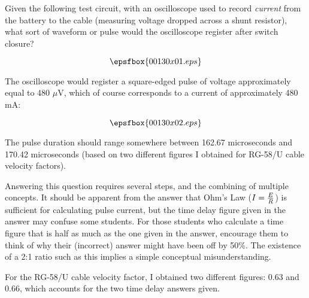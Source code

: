 

Given the following test circuit, with an oscilloscope used to record {\it current} from the battery to the cable (measuring voltage dropped across a shunt resistor), what sort of waveform or pulse would the oscilloscope register after switch closure?

$$\epsfbox{00130x01.eps}$$







The oscilloscope would register a square-edged pulse of voltage approximately equal to 480 $\mu$V, which of course corresponds to a current of approximately 480 mA:

$$\epsfbox{00130x02.eps}$$

The pulse duration should range somewhere between 162.67 microseconds and 170.42 microseconds (based on two different figures I obtained for RG-58/U cable velocity factors).







Answering this question requires several steps, and the combining of multiple concepts.  It should be apparent from the answer that Ohm's Law ($I = {E \over R}$) is sufficient for calculating pulse current, but the time delay figure given in the answer may confuse some students.  For those students who calculate a time figure that is half as much as the one given in the answer, encourage them to think of why their (incorrect) answer might have been off by 50\%.  The existence of a 2:1 ratio such as this implies a simple conceptual misunderstanding.

For the RG-58/U cable velocity factor, I obtained two different figures: 0.63 and 0.66, which accounts for the two time delay answers given.





